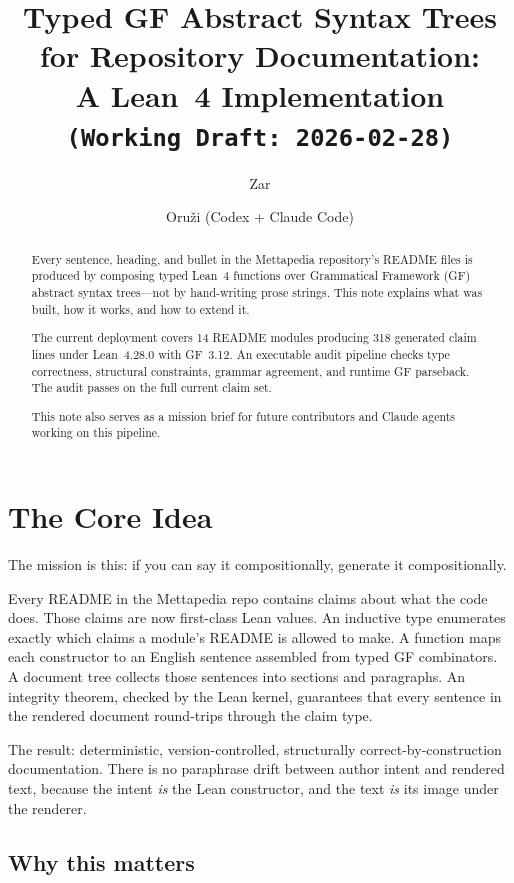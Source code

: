 \documentclass[11pt]{article}
\title{Typed GF Abstract Syntax Trees for Repository Documentation:\\
A Lean~4 Implementation\\\texttt{(Working Draft: 2026-02-28)}}
\author{Zar \and Oru\v{z}i (Codex + Claude Code)}
\begin{document}
\maketitle

\begin{abstract}
Every sentence, heading, and bullet in the Mettapedia repository's README files is
produced by composing typed Lean~4 functions over Grammatical Framework (GF) abstract
syntax trees---not by hand-writing prose strings.
This note explains what was built, how it works, and how to extend it.

The current deployment covers 14 README modules producing 318 generated claim lines
under Lean~4.28.0 with GF~3.12.  An executable audit pipeline checks type correctness,
structural constraints, grammar agreement, and runtime GF parseback.
The audit passes on the full current claim set.

This note also serves as a mission brief for future contributors and Claude agents
working on this pipeline.
\end{abstract}

\section{The Core Idea}

The mission is this: if you can say it compositionally, generate it compositionally.

Every README in the Mettapedia repo contains claims about what the code does.
Those claims are now first-class Lean values.  An inductive type enumerates
exactly which claims a module's README is allowed to make.  A function maps
each constructor to an English sentence assembled from typed GF combinators.
A document tree collects those sentences into sections and paragraphs.
An integrity theorem, checked by the Lean kernel, guarantees that every sentence
in the rendered document round-trips through the claim type.

The result: deterministic, version-controlled, structurally correct-by-construction
documentation.  There is no paraphrase drift between author intent and rendered text,
because the intent \emph{is} the Lean constructor, and the text \emph{is} its image
under the renderer.

\subsection{Why this matters}
\end{document}
